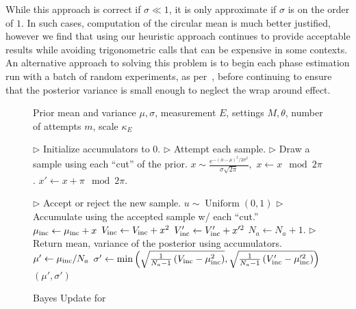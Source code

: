 \documentclass[aps,pra,amsmath,twocolumn,amssymb,superscriptaddress]{revtex4-1}
\newcommand{\linecomment}[1]{\State \(\triangleright\) {\footnotesize #1} \normalsize}
\newcommand{\CRej}{\text{RejS }}
\begin{document}
While this approach is correct if $\sigma\ll 1$, it is only approximate if $\sigma$ is on the order of $1$.  In such cases, computation of the circular mean is much better justified, however we find that using our heuristic approach continues to provide acceptable results while avoiding trigonometric calls that can be expensive in some contexts.  An alternative approach to solving this problem is to begin each phase estimation run with a batch of random experiments, as per~\cite{SHF14}, before continuing to ensure that the posterior variance is small enough to neglect the wrap around effect.
\begin{figure}[h]
\begin{algorithm}[H]
    \caption{Bayes Update for \CRej}
    \label{alg:crej}
    \begin{algorithmic}

        \Require Prior mean and variance $\mu,\sigma$, measurement $E$,
            settings $M,\theta$, number of attempts $m$, scale $\kappa_E$

        \linecomment{Initialize accumulators to 0.}
        \linecomment{Attempt each sample.}
            \linecomment{Draw a sample using each ``cut'' of the prior.}
            \State $x \sim\frac{e^{-(\phi-\mu)^2/2 \sigma^2}}{\sigma\sqrt{2 \pi }},$
            \State $x\gets x \mod 2 \pi$.
            \State $x'\gets x+\pi \mod 2 \pi$.

            \linecomment{Accept or reject the new sample.}
            \State $u \sim \operatorname{Uniform}(0, 1)$
                \linecomment{Accumulate using the accepted sample w/ each ``cut.''}
                \State $\mu_{\rm inc} \gets \mu_{\rm inc}+ x$
                \State $V_{\rm inc} \gets V_{\rm inc}+ x^2$
                \State $V_{\rm inc}' \gets V_{\rm inc}'+ x'^2$
                \State $N_a \gets N_a +1$.
            \EndIf
        \EndFor
        \linecomment{Return mean, variance of the posterior using accumulators.}
        \State $\mu'\gets \mu_{\rm inc}/N_a $
        \State $\sigma' \gets \min\left(\sqrt{\frac{1}{N_a -1}\left(V_{\rm inc} - \mu_{\rm inc}^2 \right)},\sqrt{\frac{1}{N_a -1}\left(V_{\rm inc}' - \mu_{\rm inc}'^2 \right)}\right)$%
        \State\Return $(\mu',\sigma')$

    \end{algorithmic}
\end{algorithm}
\end{figure}
\end{document}
